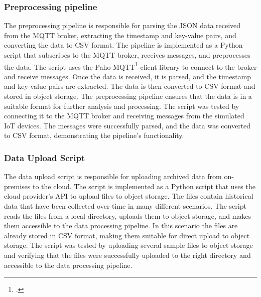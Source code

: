 \subsubsection{Preprocessing pipeline}
The preprocessing pipeline is responsible for parsing the JSON data received from the MQTT broker, extracting the timestamp and key-value pairs, and converting the data to CSV format. The pipeline is implemented as a Python script that subscribes to the MQTT broker, receives messages, and preprocesses the data. The script uses the \href{https://pypi.org/project/paho-mqtt/}{Paho MQTT}\footcite{site:paho-mqtt} client library to connect to the broker and receive messages. Once the data is received, it is parsed, and the timestamp and key-value pairs are extracted. The data is then converted to CSV format and stored in object storage. The preprocessing pipeline ensures that the data is in a suitable format for further analysis and processing. The script was tested by connecting it to the MQTT broker and receiving messages from the simulated IoT devices. The messages were successfully parsed, and the data was converted to CSV format, demonstrating the pipeline's functionality.

\subsubsection{Data Upload Script}
The data upload script is responsible for uploading archived data from on-premises to the cloud. The script is implemented as a Python script that uses the cloud provider's API to upload files to object storage. The files contain historical data that have been collected over time in many different scenarios. The script reads the files from a local directory, uploads them to object storage, and makes them accessible to the data processing pipeline. In this scenario the files are already stored in CSV format, making them suitable for direct upload to object storage. The script was tested by uploading several sample files to object storage and verifying that the files were successfully uploaded to the right directory and accessible to the data processing pipeline. 


